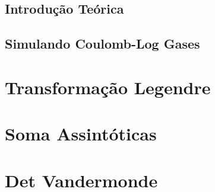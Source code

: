 \documentclass[11pt,oneside,a4paper]{report}
\begin{document}
\section{Introdução Teórica}


\section{Simulando Coulomb-Log Gases}


{}


\appendix
\chapter{Transformação Legendre}
\label{apdx: legendre}


\chapter{Soma Assintóticas}
\label{apdx: somaassin}


\chapter{Det Vandermonde}
\label{apdx: vandermonde}

\end{document}
